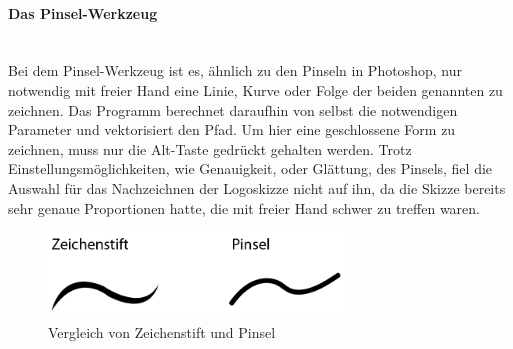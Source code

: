\paragraph{Das Pinsel-Werkzeug}
\leavevmode \\
Bei dem Pinsel-Werkzeug ist es, ähnlich zu den Pinseln in Photoshop, nur notwendig mit freier Hand eine Linie, Kurve oder Folge der beiden genannten zu zeichnen. Das Programm berechnet daraufhin von selbst die notwendigen Parameter und vektorisiert den Pfad. Um hier eine geschlossene Form zu zeichnen, muss nur die Alt-Taste gedrückt gehalten werden. Trotz Einstellungsmöglichkeiten, wie Genauigkeit, oder Glättung, des Pinsels, fiel die Auswahl für das Nachzeichnen der Logoskizze nicht auf ihn, da die Skizze bereits sehr genaue Proportionen hatte, die mit freier Hand schwer zu treffen waren.\cite{pinsel}
\leavevmode \\

\begin{figure}[H] 
  \centering
     \includegraphics[width=0.7\textwidth]{design_abb2.png}
  \caption{Vergleich von Zeichenstift und Pinsel}
\end{figure}

